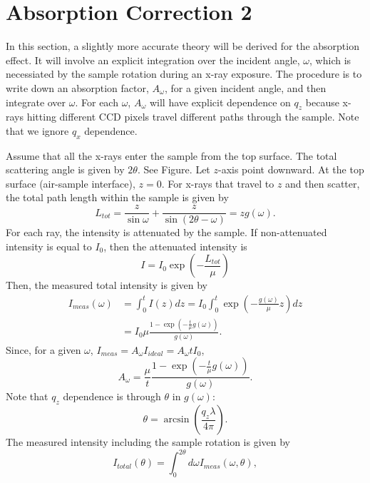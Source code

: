 \documentclass[letterpaper,12pt]{article}
\begin{document}
\section{Absorption Correction 2}
In this section, a slightly more accurate theory will be derived for the absorption
effect. It will involve an explicit integration over the incident angle, $\omega$,
which is necessiated by the sample rotation during an x-ray exposure. The procedure
is to write down an absorption factor, $A_{\omega}$, for a given incident angle, and
then integrate over $\omega$. For each $\omega$, $A_{\omega}$ will have explicit
dependence on $q_z$ because x-rays hitting different CCD pixels travel different 
paths through the sample. Note that we ignore $q_x$ dependence.

Assume that all the x-rays enter the sample from the top surface. The total scattering
angle is given by $2\theta$. See Figure. Let $z$-axis point downward. At the top surface
(air-sample interface), $z=0$. For x-rays that travel to $z$ and then scatter, the
total path length within the sample is given by
\begin{equation}
  L_{tot} = \frac{z}{\sin\omega}+\frac{z}{\sin(2\theta-\omega)} = zg(\omega).
\end{equation}
For each ray, the intensity is attenuated by the sample. If non-attenuated 
intensity is equal to $I_0$, then the attenuated intensity is
\begin{equation}
  I = I_0\exp\left(-\frac{L_{tot}}{\mu}\right)
\end{equation}
Then, the measured total intensity is given by
\begin{align}
  I_{meas}(\omega) 
    &= \int_0^t I(z) dz
     = I_0\int_0^t \exp\left(-\frac{g(\omega)}{\mu}z\right)dz \nonumber \\
    &= I_0\mu \frac{1-\exp\left(-\frac{t}{\mu}g(\omega)\right)}{g(\omega)}.
\end{align}
Since, for a given $\omega$, $I_{meas}=A_{\omega}I_{ideal}=A_{\omega}tI_0$, 
\begin{equation}
  A_{\omega} = \frac{\mu}{t} 
               \frac{1-\exp\left(-\frac{t}{\mu}g(\omega)\right)}{g(\omega)}.
\end{equation}
Note that $q_z$ dependence is through $\theta$ in $g(\omega)$:
\begin{equation}
  \theta = \arcsin\left(\frac{q_z\lambda}{4\pi}\right).
\end{equation}
The measured intensity including the sample rotation is given by
\begin{equation}
  I_{total}(\theta) = \int_0^{2\theta}d\omega I_{meas}(\omega,\theta),
\end{equation}
\end{document}
